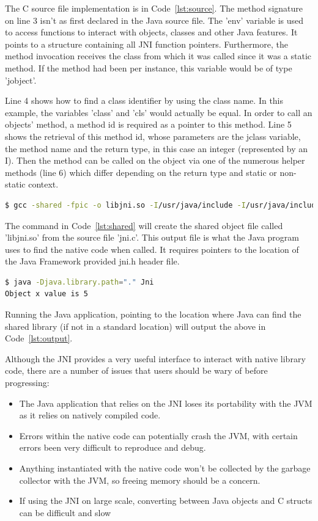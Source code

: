 \documentclass[final_report.tex]{subfiles}
\begin{document}
The C source file implementation is in Code~\ref{lst:source}. The method signature on line 3 isn't as first declared in the Java source file. The 'env' variable is used to access functions to interact with objects, classes and other Java features. It points to a structure containing all JNI function pointers. Furthermore, the method invocation receives the class from which it was called since it was a static method. If the method had been per instance, this variable would be of type 'jobject'.

Line 4 shows how to find a class identifier by using the class name. In this example, the variables 'class' and 'cls' would actually be equal. In order to call an objects' method, a method id is required as a pointer to this method. Line 5 shows the retrieval of this method id, whose parameters are the jclass variable, the method name and the return type, in this case an integer (represented by an I). Then the method can be called on the object via one of the numerous helper methods (line 6) which differ depending on the return type and static or non-static context.

\begin{lstlisting}[language=sh, caption={Terminal commands to generate shared library file (.so)}, label=lst:shared]
$ gcc -shared -fpic -o libjni.so -I/usr/java/include -I/usr/java/include/linux jni.c
\end{lstlisting}

The command in Code~\ref{lst:shared} will create the shared object file called 'libjni.so' from the source file 'jni.c'. This output file is what the Java program uses to find the native code when called. It requires pointers to the location of the Java Framework provided jni.h header file.

\begin{lstlisting}[language=sh, caption={Output from running Java application calling native C methods}, label=lst:output]
$ java -Djava.library.path="." Jni
Object x value is 5
\end{lstlisting}

Running the Java application, pointing to the location where Java can find the shared library (if not in a standard location) will output the above in Code~\ref{lst:output}.

Although the JNI provides a very useful interface to interact with native library code, there are a number of issues that users should be wary of before progressing:
\begin{itemize}
	\item The Java application that relies on the JNI loses its portability with the JVM as it relies on natively compiled code.
	\item Errors within the native code can potentially crash the JVM, with certain errors been very difficult to reproduce and debug.
	\item Anything instantiated with the native code won't be collected by the garbage collector with the JVM, so freeing memory should be a concern.
	\item If using the JNI on large scale, converting between Java objects and C structs can be difficult and slow
\end{itemize}
\end{document}
